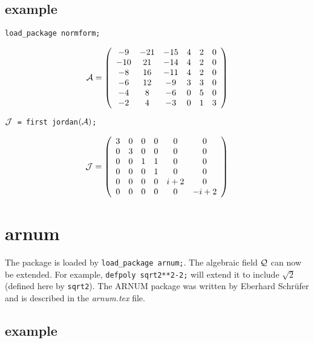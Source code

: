 \subsection{example}

{\tt load\_package normform;}

\begin{displaymath}
{\cal A} = \left( \begin{array}{cccccc} -9 & -21 & -15 & 4 & 2 & 0 \\
-10 & 21 & -14 & 4 & 2 & 0 \\ -8 & 16 & -11 & 4 & 2 & 0 \\ -6 & 12 & -9
& 3 & 3 & 0 \\ -4 & 8 & -6 & 0 & 5 & 0 \\ -2 & 4 & -3 & 0 & 1 & 3
\end{array} \right)
\end{displaymath}

\begin{flushleft}
{\tt ${\cal J}$ = first jordan$({\cal A})$;}
\end{flushleft}

\begin{displaymath}
{\cal J} = \left( \begin{array}{cccccc} 3 & 0 & 0 & 0 & 0 & 0 \\ 0 & 3
& 0 & 0 & 0 & 0 \\ 0 & 0 & 1 & 1 & 0 & 0 \\ 0 & 0 & 0 & 1 & 0 & 0 \\
 0 & 0 & 0 & 0 & i+2 & 0 \\ 0 & 0 & 0 & 0 & 0 & -i+2
\end{array} \right)
\end{displaymath}

\newpage


\section{arnum}

The package is loaded by {\tt load\_package arnum;}. The algebraic
field ${\cal Q}$ can now be extended. For example, {\tt defpoly
sqrt2**2-2;} will extend it to include ${\sqrt{2}}$ (defined here by
{\tt sqrt2}). The {\small ARNUM} package was written by Eberhard
Schr\"ufer and is described in the {\it arnum.tex} file.

\subsection{example}

